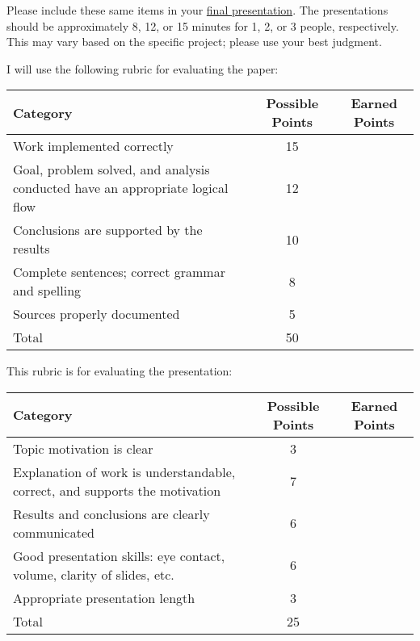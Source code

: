 \documentclass[a4paper, 12 pt]{curve}
\begin{document}
\vspace*{2em}
Please include these same items in your \underline{final presentation}. The presentations should be approximately 8, 12, or 15 minutes for 1, 2, or 3 people, respectively. This may vary based on the specific project; please use your best judgment.

\vspace*{2em}


\vspace*{2em}
I will use the following rubric for evaluating the paper:

\vspace*{1 em}
\begin{center}
\begin{tabu}{| X | c | c |}\hline
\textbf{Category} & \textbf{Possible Points} & \textbf{Earned Points} \\ \hline \hline
Work implemented correctly & 15 & \\ \hline
Goal, problem solved, and analysis conducted have an appropriate logical flow & 12 & \\ \hline
Conclusions are supported by the results & 10 & \\ \hline
Complete sentences; correct grammar and spelling & 8 & \\ \hline
Sources properly documented & 5 & \\ \hline
Total & 50 & \\\hline
\end{tabu} 
\end{center}

This rubric is for evaluating the presentation:

\vspace*{1 em}
\begin{center}
\begin{tabu}{| X | c | c |}\hline
\textbf{Category} & \textbf{Possible Points} & \textbf{Earned Points} \\ \hline \hline
Topic motivation is clear & 3 & \\ \hline
Explanation of work is understandable, correct, and supports the motivation & 7 & \\ \hline
Results and conclusions are clearly communicated & 6 & \\ \hline
Good presentation skills: eye contact, volume, clarity of slides, etc. & 6 & \\ \hline
Appropriate presentation length & 3 & \\ \hline
Total & 25 & \\\hline
\end{tabu} 
\end{center}
\end{document}
